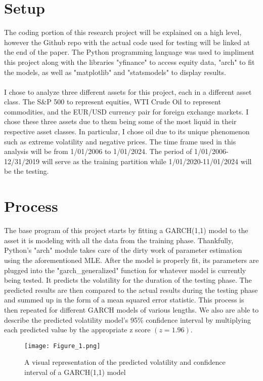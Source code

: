 \documentclass{article}
\begin{document}
\section{Setup}
The coding portion of this research project will be explained on a high level, however the Github repo with the actual code used for testing will be linked at the end of the paper. The Python programming language was used to impliment this project along with the libraries "yfinance" to access equity data, "arch" to fit the models, as well as "matplotlib" and "statsmodels" to display results.  \\
\\
I chose to analyze three different assets for this project, each in a different asset class. The S\&P 500 to represent equities, WTI Crude Oil to represent commodities, and the EUR/USD currency pair for foreign exchange markets. I chose these three assets due to them being some of the most liquid in their respective asset classes. In particular, I chose oil due to its unique phenomenon such as extreme volatility and negative prices. The time frame used in this analysis will be from 1/01/2006 to 1/01/2024. The period of 1/01/2006-12/31/2019 will serve as the training partition while 1/01/2020-11/01/2024 will be the testing.
\section{Process}
The base program of this project starts by fitting a GARCH(1,1) model to the asset it is modeling with all the data from the training phase. Thankfully, Python's "arch" module takes care of the dirty work of parameter estimation using the aforementioned MLE. After the model is properly fit, its parameters are plugged into the "garch\_generalized" function for whatever model is currently being tested. It predicts the volatility for the duration of the testing phase. The predicted results are then compared to the actual results during the testing phase and summed up in the form of a mean squared error statistic. This process is then repeated for different GARCH models of various lengths. We also are able to describe the predicted volatility model's 95\% confidence interval by multiplying each predicted value by the appropriate z score $(z=1.96)$.
\begin{figure}[h!]
\centering
\texttt{[image: Figure\_1.png]}
\caption{A visual representation of the predicted volatility and confidence interval of a GARCH(1,1) model}
\end{figure}
\end{document}
